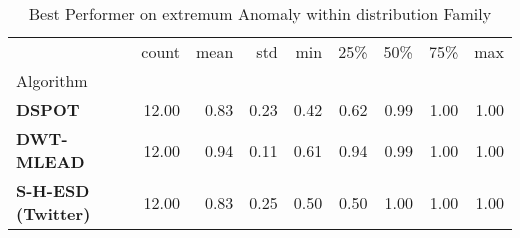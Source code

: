 \begin{table}
\caption{Best Performer on extremum Anomaly within distribution Family}
\label{tab:bp-extremum_distribution}
\begin{tabular}{lrrrrrrrr}
\toprule
 & count & mean & std & min & 25\% & 50\% & 75\% & max \\
Algorithm &  &  &  &  &  &  &  &  \\
\midrule
\textbf{DSPOT} & 12.00 & 0.83 & 0.23 & 0.42 & 0.62 & 0.99 & 1.00 & 1.00 \\
\textbf{DWT-MLEAD} & 12.00 & 0.94 & 0.11 & 0.61 & 0.94 & 0.99 & 1.00 & 1.00 \\
\textbf{S-H-ESD (Twitter)} & 12.00 & 0.83 & 0.25 & 0.50 & 0.50 & 1.00 & 1.00 & 1.00 \\
\bottomrule
\end{tabular}
\end{table}
